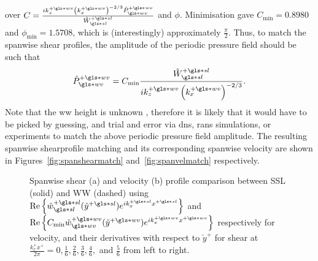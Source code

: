 over $C=\frac{ik_z\pw \left( k_x\pw \right) ^{-2 /3}\hat{P}\pw\ww }{\hat{W}\ps\ssl}$ and $\phi $. Minimisation gave $C_\text{min} = 0.8980$ and $\phi _\text{min} =1.5708$, which is (interestingly) approximately $\frac{\pi}{2}$. Thus, to match the spanwise shear profiles, the amplitude of the periodic pressure field should be such that
\begin{equation}
	\hat{P}\pw\ww=C_\text{min} \frac{\hat{W}\ps\ssl}{ik_z\pw \left(k_x\pw\right)^{-2 /3}}\label{eq:phtselect}
.\end{equation}
Note that the \gls*{ww} height is unknown , therefore it is likely that it would have to be picked by guessing, and trial and error via \gls*{dns}, \gls*{rans} simulations, or experiments to match the above periodic pressure field amplitude. The resulting spanwise shearprofile matching and its corresponding spanwise velocity are shown in Figures~\ref{fig:spanshearmatch} and~\ref{fig:spanvelmatch} respectively.

\begin{figure}[htbp]
	\centering
	\caption[Spanwise shear and velocity profile comparison between SSL and WW]{Spanwise shear (a) and velocity (b) profile comparison between SSL (solid) and WW (dashed) using $\Re \left\{ \check{w}\ps\ssl (\check{y}\ps)e ^{ik_x\ps x\ps} \right\} $ and $\Re \left\{ C_\text{min} \check{w}\pw\ww (\check{y}\pw)e ^{ik_x\pw x\pw} \right\} $ respectively for velocity, and their derivatives with respect to $\check{y}^{+}$ for shear at $\frac{k_x^{+}x^{+}}{2\pi}=0, \frac{1}{6}, \frac{2}{6}, \frac{3}{6}, \frac{4}{6},$ and $\frac{5}{6}$ from left to right.}
	\label{fig:spanmatch}
\end{figure}

